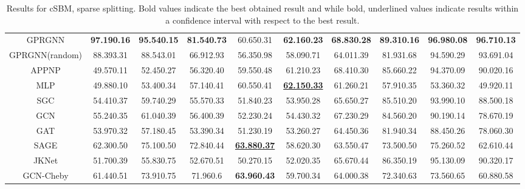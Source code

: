 \documentclass{article} \usepackage{iclr2021_conference,times}
\begin{document}
\begin{table}[ht]
\caption{Results for cSBM, sparse splitting. Bold values indicate the best obtained result and while bold, underlined values indicate results within a  confidence interval with respect to the best result.}
\label{tab:cSBM_sparse}
\vspace{0.2cm}
\scriptsize
\begin{tabular}{@{}cccccccccc@{}}
\toprule
 &
   &
   &
   &
   &
   &
   &
   &
   &
   \\ \midrule
GPRGNN &
  \textbf{97.19\tiny{0.16}} &
  \textbf{95.54\tiny{0.15}} &
  \textbf{81.54\tiny{0.73}} &
  60.65\tiny{0.31} &
  \textbf{62.16\tiny{0.23}} &
  \textbf{68.83\tiny{0.28}} &
  \textbf{89.31\tiny{0.16}} &
  \textbf{96.98\tiny{0.08}} &
  \textbf{96.71\tiny{0.13}} \\
GPRGNN(random) &
  88.39\tiny{3.31} &
  88.54\tiny{3.01} &
  66.91\tiny{2.93} &
  56.35\tiny{0.98} &
  58.09\tiny{0.71} &
  64.01\tiny{1.39} &
  81.93\tiny{1.68} &
  94.59\tiny{0.29} &
  93.69\tiny{1.04} \\
APPNP &
  49.57\tiny{0.11} &
  52.45\tiny{0.27} &
  56.32\tiny{0.40} &
  59.55\tiny{0.48} &
  61.21\tiny{0.23} &
  68.41\tiny{0.30} &
  85.66\tiny{0.22} &
  94.37\tiny{0.09} &
  90.02\tiny{0.16} \\
MLP &
  49.88\tiny{0.10} &
  53.40\tiny{0.34} &
  57.14\tiny{0.41} &
  60.55\tiny{0.41} &
  {\ul \textbf{62.15\tiny{0.33}}} &
  61.26\tiny{0.21} &
  57.91\tiny{0.35} &
  53.36\tiny{0.32} &
  49.92\tiny{0.11} \\
SGC &
  54.41\tiny{0.37} &
  59.74\tiny{0.29} &
  55.57\tiny{0.33} &
  51.84\tiny{0.23} &
  53.95\tiny{0.28} &
  65.65\tiny{0.27} &
  85.51\tiny{0.20} &
  93.99\tiny{0.10} &
  88.50\tiny{0.18} \\
GCN &
  55.24\tiny{0.35} &
  61.04\tiny{0.39} &
  56.40\tiny{0.39} &
  52.23\tiny{0.24} &
  54.43\tiny{0.32} &
  67.23\tiny{0.29} &
  84.56\tiny{0.20} &
  90.19\tiny{0.14} &
  78.67\tiny{0.19} \\
GAT &
  53.97\tiny{0.32} &
  57.18\tiny{0.45} &
  53.39\tiny{0.34} &
  51.23\tiny{0.19} &
  53.26\tiny{0.27} &
  64.45\tiny{0.36} &
  81.94\tiny{0.34} &
  88.45\tiny{0.26} &
  78.06\tiny{0.30} \\
SAGE &
  62.30\tiny{0.50} &
  75.10\tiny{0.50} &
  72.84\tiny{0.44} &
  {\ul \textbf{63.88\tiny{0.37}}} &
  58.62\tiny{0.30} &
  63.55\tiny{0.47} &
  73.50\tiny{0.50} &
  75.26\tiny{0.52} &
  62.61\tiny{0.44} \\
JKNet &
  51.70\tiny{0.39} &
  55.83\tiny{0.75} &
  52.67\tiny{0.51} &
  50.27\tiny{0.15} &
  52.02\tiny{0.35} &
  65.67\tiny{0.44} &
  86.35\tiny{0.19} &
  95.13\tiny{0.09} &
  90.32\tiny{0.17} \\
GCN-Cheby &
  61.44\tiny{0.51} &
  73.91\tiny{0.75} &
  71.96\tiny{0.6} &
  \textbf{63.96\tiny{0.43}} &
  59.70\tiny{0.34} &
  64.00\tiny{0.38} &
  72.34\tiny{0.63} &
  73.56\tiny{0.65} &
  60.88\tiny{0.58} \\ \bottomrule
\end{tabular}
\normalsize
\end{table}
\end{document}
